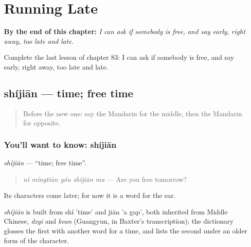 
\chapter{Running Late}
\label{ch:zh-running-late}

\begin{chapteropening}
\textbf{By the end of this chapter:} \emph{I can ask if somebody is free, and say early, right away, too late and late.}

Complete the last lesson of chapter 83: I can ask if somebody is free, and say early, right away, too late and late.
\end{chapteropening}

\section[shíjiān]{shíjiān — time; free time}

\label{lesson:ZH-C83-shijian}



\begin{quote}
Before the new one: say the Mandarin for the middle, then the Mandarin for opposite.
\end{quote}

\subsection*{You'll want to know: shíjiān}
\emph{shíjiān} — \textquotedblleft{}time; free time\textquotedblright{}.

\begin{quote}
\emph{nǐ míngtiān yǒu shíjiān ma} — Are you free tomorrow?
\end{quote}

Its characters come later; for now it is a word for the ear.

\begin{cousinweb}
\emph{shíjiān} is built from shí 'time' and jiān 'a gap', both inherited from Middle Chinese, \emph{dzyi} and \emph{kean} (Guangyun, in Baxter's transcription); the dictionary glosses the first with another word for a time, and lists the second under an older form of the character.
\end{cousinweb}


